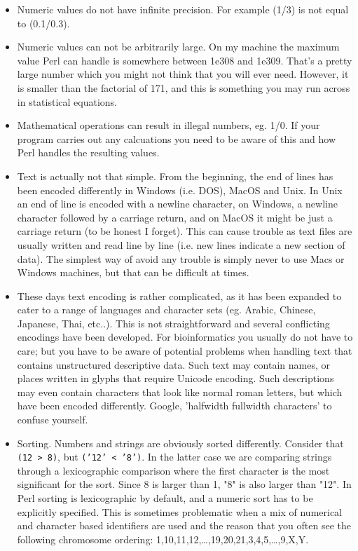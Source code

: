 \documentclass[11pt]{article}
\begin{document}
\begin{itemize}
\item Numeric values do not have infinite precision. For example (1/3) is
not equal to (0.1/0.3).

\item Numeric values can not be arbitrarily large. On my machine the
maximum value Perl can handle is somewhere between 1e308 and
1e309. That's a pretty large number which you might not think that
you will ever need.  However, it is smaller than the factorial of
171, and this is something you may run across in statistical
equations.

\item Mathematical operations can result in illegal numbers, eg. 1/0. If
your program carries out any calcuations you need to be aware of
this and how Perl handles the resulting values.

\item Text is actually not that simple. From the beginning, the end of
lines has been encoded differently in Windows (i.e. DOS), MacOS and
Unix. In Unix an end of line is encoded with a newline character, on
Windows, a newline character followed by a carriage return, and on
MacOS it might be just a carriage return (to be honest I
forget). This can cause trouble as text files are usually written
and read line by line (i.e.  new lines indicate a new section of
data). The simplest way of avoid any trouble is simply never to use
Macs or Windows machines, but that can be difficult at times.

\item These days text encoding is rather complicated, as it has been
expanded to cater to a range of languages and character sets
(eg. Arabic, Chinese, Japanese, Thai, etc..). This is not
straightforward and several conflicting encodings have been
developed. For bioinformatics you usually do not have to care; but
you have to be aware of potential problems when handling text that
contains unstructured descriptive data. Such text may contain
names, or places written in glyphs that require Unicode
encoding. Such descriptions may even contain characters that look
like normal roman letters, but which have been encoded differently.
Google, 'halfwidth fullwidth characters' to confuse yourself.

\item Sorting. Numbers and strings are obviously sorted
differently. Consider that \texttt{(12 > 8)}, but \texttt{('12' < '8')}. In the latter
case we are comparing strings through a lexicographic comparison
where the first character is the most significant for the
sort. Since 8 is larger than 1, "8" is also larger than "12". In
Perl sorting is lexicographic by default, and a numeric sort has to
be explicitly specified. This is sometimes problematic when a mix of
numerical and character based identifiers are used and the reason
that you often see the following chromosome ordering:
1,10,11,12,\ldots{},19,20,21,3,4,5,\ldots{},9,X,Y.
\end{itemize}
\end{document}

